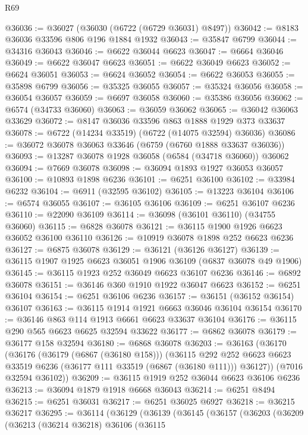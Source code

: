 \begin{lexlean}{R69}
\begin{coremodule}
{@36036 := @36027 (@36030 (@6722 (@6729 @36031) @8497))
@36042 := @8183 @36036 @33596 @806 @196 @1884 @1932
@36043 := @35847 @6799
@36044 := @34316 @36043
@36046 := @6622 @36044 @6623
@36047 := @6664 @36046
@36049 := @6622 @36047 @6623
@36051 := @6622 @36049 @6623
@36052 := @6624 @36051
@36053 := @6624 @36052
@36054 := @6622 @36053
@36055 := @35898 @6799
@36056 := @35325 @36055
@36057 := @35324 @36056
@36058 := @36054 @36057
@36059 := @6697 @36058
@36060 := @35386 @36056
@36062 := @6574 (@34733 @36060)
@36063 := @36059 @36062
@36065 := @36042 @36063 @33629
@36072 := @8147 @36036 @33596 @863 @1888 @1929 @373 @33637
@36078 := @6722 (@14234 @33519) (@6722 (@14075 @32594) @36036)
@36086 := @36072 @36078 @36063 @33646 (@6759 (@6760 @1888 @33637 @36036))
@36093 := @13287 @36078 @1928 @36058 (@6584 (@34718 @36060)) @36062
@36094 := @7669 @36078
@36098 := @36094 @1893 @1927 @36053 @36057
@36100 := @10893 @1898 @6236
@36101 := @6251 @36100
@36102 := @33984 @6232
@36104 := @6911 (@32595 @36102)
@36105 := @13223 @36104
@36106 := @6574 @36055
@36107 := @36105 @36106
@36109 := @6251 @36107 @6236
@36110 := @22090 @36109
@36114 := @36098 (@36101 @36110) (@34755 @36060)
@36115 := @6828 @36078
@36121 := @36115 @1900 @1926 @6623 @36052 @36100 @36110
@36126 := @10919 @36078 @1898 @252 @6623 @6236
@36127 := @6875 @36078
@36129 := @36121 (@36126 @36127)
@36139 := @36115 @1907 @1925 @6623 @36051 @1906 @36109 (@6837 @36078 @49 @1906)
@36145 := @36115 @1923 @252 @36049 @6623 @36107 @6236
@36146 := @6892 @36078
@36151 := @36146 @360 @1910 @1922 @36047 @6623
@36152 := @6251 @36104
@36154 := @6251 @36106 @6236
@36157 := @36151 (@36152 @36154) @36107
@36163 := @36115 @1914 @1921 @6663 @36046 @36104 @36154
@36170 := @36146 @863 @114 @1913 @6661 @6623 @33637 @36104
@36176 := @36115 @290 @565 @6623 @6625 @32594 @33622
@36177 := @6862 @36078
@36179 := @36177 @158 @32594
@36180 := @6868 @36078
@36203 := @36163
    (@36170
      (@36176
        (@36179 (@6867 (@36180 @158)))
        (@36115
          @292
          @252
          @6623
          @6623
          @33519
          @6236
          (@36177 @111 @33519 (@6867 (@36180 @111)))
          @36127))
      (@7016 @32594 @36102))
@36209 := @36115 @1919 @252 @36044 @6623 @36106 @6236
@36213 := @36094 @1879 @1918 @6668 @36043
@36214 := @6251 @8494
@36215 := @6251 @36031
@36217 := @6251 @36025 @6927
@36218 := @36215 @36217
@36295 := @36114
    (@36129
      (@36139
        (@36145
          (@36157
            (@36203
              (@36209
                (@36213
                  (@36214 @36218)
                  @36106
                  (@36115
}
\end{coremodule}
\end{lexlean}
